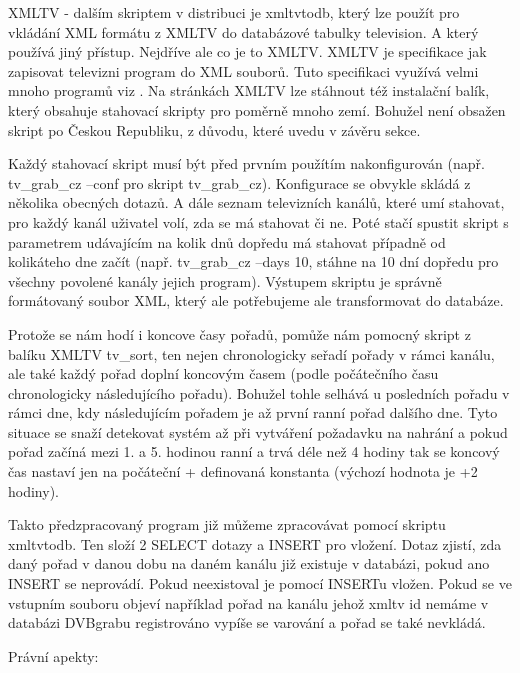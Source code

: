 \vspace{10pt}

XMLTV - dalším skriptem v distribuci je xmltvtodb, který lze použít pro vkládání XML formátu z XMLTV do databázové tabulky television. A který používá jiný přístup. Nejdříve ale co je to XMLTV. XMLTV je specifikace jak zapisovat televizni program do XML souborů. Tuto specifikaci využívá velmi mnoho programů viz \cite{xmltvURL}. Na stránkách XMLTV lze stáhnout též instalační balík, který obsahuje stahovací skripty pro poměrně mnoho zemí. Bohužel není obsažen skript po Českou Republiku, z důvodu, které uvedu v závěru sekce.

Každý stahovací skript musí být před prvním použítím nakonfigurován (např. tv\_grab\_cz --conf pro skript tv\_grab\_cz). Konfigurace se obvykle skládá z několika obecných dotazů. A dále seznam televizních kanálů, které umí stahovat, pro každý kanál uživatel volí, zda se má stahovat či ne. Poté stačí spustit skript s parametrem udávajícím na kolik dnů dopředu má stahovat případně od kolikáteho dne začít (např. tv\_grab\_cz --days 10, stáhne na 10 dní dopředu pro všechny povolené kanály jejich program). Výstupem skriptu je správně formátovaný soubor XML, který ale potřebujeme ale transformovat do databáze.

Protože se nám hodí i koncove časy pořadů, pomůže nám pomocný skript z balíku XMLTV tv\_sort, ten nejen chronologicky seřadí pořady v rámci kanálu, ale také každý pořad doplní koncovým časem (podle počátečního času chronologicky následujícího pořadu). Bohužel tohle selhává u posledních pořadu v rámci dne, kdy následujícím pořadem je až první ranní pořad dalšího dne. Tyto situace se snaží detekovat systém až při vytváření požadavku na nahrání a pokud pořad začíná mezi 1. a 5. hodinou ranní a trvá déle než 4 hodiny tak se koncový čas nastaví jen na počáteční + definovaná konstanta (výchozí hodnota je +2 hodiny).

Takto předzpracovaný program již můžeme zpracovávat pomocí skriptu xmltvtodb. Ten složí 2 SELECT dotazy a INSERT pro vložení. Dotaz zjistí, zda daný pořad v danou dobu na daném kanálu již existuje v databázi, pokud ano INSERT se neprovádí. Pokud neexistoval je pomocí INSERTu vložen. Pokud se ve vstupním souboru objeví například pořad na kanálu jehož xmltv id nemáme v databázi DVBgrabu registrováno vypíše se varování a pořad se také nevkládá.

Právní apekty:

